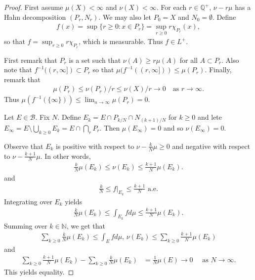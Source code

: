 \documentclass[11pt]{amsart}
\theoremstyle{definition}
\numberwithin{equation}{section}
\begin{document}
\begin{proof}
    First assume $\mu(X)<\infty$ and $\nu(X)<\infty$. For each $r\in\mathbb Q^+$, $\nu-r\mu$ has a Hahn decomposition $(P_r,N_r)$. We may also let $P_0=X$ and $N_0=\emptyset$. Define 
    \begin{align*}
        f(x)=\sup\{r\ge 0:x\in P_r\}=\sup_{r\ge 0}r\chi_{P_r}(x),
    \end{align*}
    so that $f=\sup_{r\ge 0}r\chi_{P_r}$, which is measurable. Thus $f\in L^+$.

    First remark that $P_r$ is a set such that $\nu(A)\ge r\mu(A)$ for all $A\subset P_r$. Also note that $f^{-1}((r,\infty])\subset P_r$ so that $\mu(f^{-1}((r,\infty]))\le \mu(P_r)$. Finally, remark that
    \begin{align*}
        \mu(P_r)\le \nu(P_r)/r\le \nu(X)/r\to 0\quad \text{as }r\to\infty.
    \end{align*}
    Thus $\mu(f^{-1}(\{\infty\}))\le\lim_{n\to\infty}\mu(P_r)=0$.

    Let $E\in\mathcal B$. Fix $N$. Define $E_k=E\cap P_{k/N}\cap N_{(k+1)/N}$ for $k\ge 0$ and lete $E_\infty=E\setminus \bigcup_{k\ge 0}E_k=E\cap\bigcap_rP_r$. Then $\mu(E_\infty)=0$ and so $\nu(E_\infty)=0$.

    Observe that $E_k$ is positive with respect to $\nu-\frac{k}{N}\mu\ge 0$ and negative with respect to $\nu-\frac{k+1}{N}\mu$. In other words,
    \begin{align*}
        \frac{k}{N}\mu(E_k)\le \nu(E_k)\le \frac{k+1}{N}\mu(E_k).
    \end{align*}
    and
    \begin{align*}
        \frac{k}{N}\le f|_{E_k}\le \frac{k+1}{N}\text{ a.e.}
    \end{align*}
    Integrating over $E_k$ yields 
    \begin{align*}
        \frac{k}{N}\mu(E_k)\le \int_{E_k}fd\mu\le\frac{k+1}{N}\mu(E_k).
    \end{align*}
    Summing over $k\in\mathbb N$, we get that
    \begin{align*}
        \sum_{k\ge 0}\frac{k}{N}\mu(E_k)\le\int_Efd\mu,\,\nu(E_k)\le\sum_{k\ge 0}\frac{k+1}{N}\mu(E_k)
    \end{align*}
    and
    \begin{align*}
        \sum_{k\ge 0}\frac{k+1}{N}\mu(E_k)-\sum_{k\ge 0}\frac{k}{N}\mu(E_k)&=\frac{1}{N}\mu(E)\to 0\quad \text{ as }N\to\infty.
    \end{align*}
    This yields equality.


\end{proof}
\end{document}
